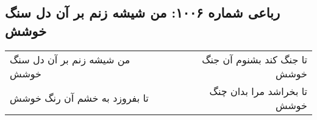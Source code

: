 \begin{center}
\section*{رباعی شماره ۱۰۰۶: من شیشه زنم بر آن دل سنگ خوشش}
\label{sec:1006}
\begin{longtable}{l p{0.5cm} r}
من شیشه زنم بر آن دل سنگ خوشش
&&
تا جنگ کند بشنوم آن جنگ خوشش
\\
تا بفروزد به خشم آن رنگ خوشش
&&
تا بخراشد مرا بدان چنگ خوشش
\\
\end{longtable}
\end{center}
